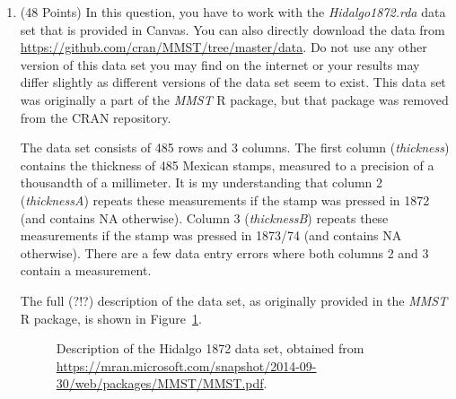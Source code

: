 \documentclass[12pt,letterpaper,final]{article}
\begin{document}
\begin{enumerate}

\item (48 Points)
In this question, you have to work with the {\it Hidalgo1872.rda} data set
that is provided in Canvas. You can also directly download the data from 
\url{https://github.com/cran/MMST/tree/master/data}.
Do not use any other version of this data set you may find on the
internet
or your results may differ slightly as different versions
of the data set seem to exist. This data set was
originally a part of the {\it MMST} R package, but that
package was removed from the CRAN repository. 

The data set consists of 485 rows and 3 columns. The first column
({\it thickness}) contains the thickness of 485 Mexican stamps,
measured to a precision of a thousandth of a millimeter.
It is my understanding that 
column 2 ({\it thicknessA}) repeats these measurements if the stamp was pressed in 1872
(and contains NA otherwise). 
Column 3 ({\it thicknessB}) repeats these measurements if the stamp was pressed in 1873/74
(and contains NA otherwise). 
There are a few data entry errors where both columns 2 and 3 contain 
a measurement.

The full (?!?) description of the data set, as originally provided
in the {\it MMST} R package, is shown in Figure~\ref{Hidalgo1872}.


\begin{figure}[ht]
\caption{\label{Hidalgo1872}
Description of the Hidalgo 1872 data set, obtained from 
\url{https://mran.microsoft.com/snapshot/2014-09-30/web/packages/MMST/MMST.pdf}.
}
\end{figure}




\end{enumerate}
\end{document}
